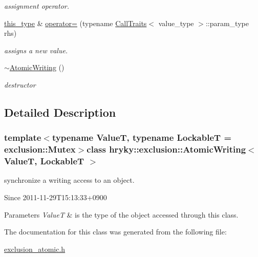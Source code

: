 \begin{DoxyCompactItemize}
\begin{DoxyCompactList}\small\item\em assignment operator. \end{DoxyCompactList}\item 
\hyperlink{classhryky_1_1exclusion_1_1_atomic_writing_afc6301af19df5cf042e0cbed6d273b2a}{this\-\_\-type} \& \hyperlink{group__exclusion__control_ga593ba1b3b563f04eeac4e468b77f7009}{operator=} (typename \hyperlink{classhryky_1_1_call_traits}{Call\-Traits}$<$ value\-\_\-type $>$\-::param\-\_\-type rhs)
\begin{DoxyCompactList}\small\item\em assigns a new value. \end{DoxyCompactList}\item 
\hyperlink{group__exclusion__control_gaaff919108eef9ef3545064188cba65f0}{$\sim$\-Atomic\-Writing} ()
\begin{DoxyCompactList}\small\item\em destructor \end{DoxyCompactList}\end{DoxyCompactItemize}


\subsection{Detailed Description}
\subsubsection*{template$<$typename Value\-T, typename Lockable\-T = exclusion\-::\-Mutex$>$class hryky\-::exclusion\-::\-Atomic\-Writing$<$ Value\-T, Lockable\-T $>$}

synchronize a writing access to an object. 

\begin{DoxySince}{Since}
2011-\/11-\/29\-T15\-:13\-:33+0900 
\end{DoxySince}

\begin{DoxyParams}{Parameters}
{\em Value\-T} & is the type of the object accessed through this class. \\
\hline
\end{DoxyParams}


The documentation for this class was generated from the following file\-:\begin{DoxyCompactItemize}
\item 
\hyperlink{exclusion__atomic_8h}{exclusion\-\_\-atomic.\-h}\end{DoxyCompactItemize}
